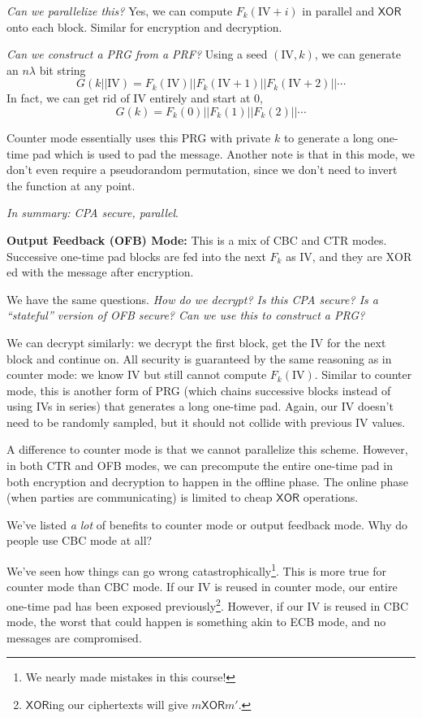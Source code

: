 \emph{Can we parallelize this?} Yes, we can compute $F_k(\mathrm{IV} + i)$ in parallel and $\mathsf{XOR}$ onto each block. Similar for encryption and decryption.

\emph{Can we construct a PRG from a PRF?} Using a seed $(\mathrm{IV}, k)$, we can generate an $n\lambda$ bit string
\[G(k||\mathrm{IV}) = F_k(\mathrm{IV})||F_k(\mathrm{IV} + 1)||F_k(\mathrm{IV} + 2)||\cdots\]
In fact, we can get rid of IV entirely and start at $0$,
\[G(k) = F_k(0)||F_k(1)||F_k(2)||\cdots\]

Counter mode essentially uses this PRG with private $k$ to generate a long one-time pad which is used to pad the message. Another note is that in this mode, we don't even require a pseudorandom permutation, since we don't need to invert the function at any point.

\emph{In summary: CPA secure, parallel}.

\textbf{Output Feedback (OFB) Mode:} This is a mix of CBC and CTR modes. Successive one-time pad blocks are fed into the next $F_k$ as IV, and they are $\mathrm{XOR}$ed with the message after encryption.


We have the same questions. \emph{How do we decrypt? Is this CPA secure? Is a ``stateful'' version of OFB secure? Can we use this to construct a PRG?}

We can decrypt similarly: we decrypt the first block, get the IV for the next block and continue on. All security is guaranteed by the same reasoning as in counter mode: we know IV but still cannot compute $F_k(\mathrm{IV})$. Similar to counter mode, this is another form of PRG (which chains successive blocks instead of using IVs in series) that generates a long one-time pad. Again, our IV doesn't need to be randomly sampled, but it should not collide with previous IV values.

A difference to counter mode is that we cannot parallelize this scheme. However, in both CTR and OFB modes, we can precompute the entire one-time pad in both encryption and decryption to happen in the offline phase. The online phase (when parties are communicating) is limited to cheap $\mathsf{XOR}$ operations.

\begin{ques*}
    We've listed \emph{a lot} of benefits to counter mode or output feedback mode. Why do people use CBC mode at all?
\end{ques*}
We've seen how things can go wrong catastrophically\footnote{We nearly made mistakes in this course!}. This is more true for counter mode than CBC mode. If our IV is reused in counter mode, our entire one-time pad has been exposed previously\footnote{$\mathsf{XOR}$ing our ciphertexts will give $m \mathsf{XOR} m'$.}. However, if our IV is reused in CBC mode, the worst that could happen is something akin to ECB mode, and no messages are compromised.

